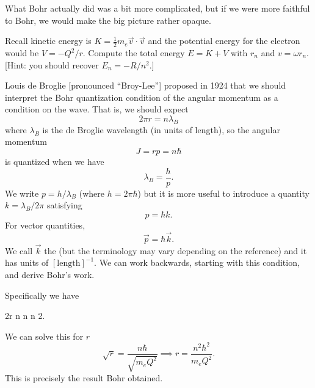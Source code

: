 \begin{remark}
What Bohr actually did was a bit more complicated, but if we were more
faithful to Bohr, we would make the big picture rather opaque.
\end{remark}

\begin{exercise}
Recall kinetic energy is $K=\frac{1}{2}m_{e}\vec{v}\cdot\vec{v}$ and the
potential energy for the electron would be $V = -Q^{2}/r$. Compute the
total energy $E = K + V$ with $r_{n}$ and $v=\omega r_{n}$. [Hint: you
  should recover $E_{n}=-R/n^{2}$.]
\end{exercise}

Louis de Broglie [pronounced ``Broy-Lee''] proposed in 1924 that we
should interpret the Bohr quantization condition of the angular momentum
as a condition on the wave. That is, we should expect
\begin{equation}
2\pi r = n\lambda_{B}
\end{equation}
where $\lambda_{B}$ is the de Broglie wavelength (in units of length), so
the angular momentum 
\begin{equation}
J = rp = n\hbar
\end{equation}
is quantized when we have
\begin{equation}
\lambda_{B} = \frac{h}{p}.
\end{equation}
We write $p = h/\lambda_{B}$ (where $h=2\pi\hbar$) but it is more useful
to introduce a quantity $k=\lambda_{B}/2\pi$ satisfying
\begin{equation}
p = \hbar k.
\end{equation}
For vector quantities,
\begin{equation}
\vec{p} = \hbar\vec{k}.
\end{equation}
We call $\vec{k}$ the  (but the terminology
may vary depending on the reference) and it has units of
$[\mbox{length}]^{-1}$. We can work backwards, starting with this
condition, and derive Bohr's work. 

Specifically we have
\begin{calculation}
2\pi r
n 
n 
n 2\pi\hbar{}.
\end{calculation}
We can solve this for $r$
\begin{equation}
  \sqrt{r} = \frac{n\hbar}{\sqrt{m_{e}Q^{2}}}\implies
r = \frac{n^{2}\hbar^{2}}{m_{e}Q^{2}}.
\end{equation}
This is precisely the result Bohr obtained.

